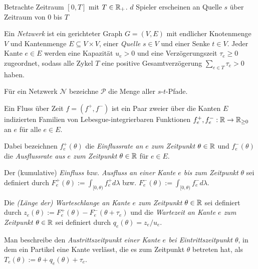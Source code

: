 Betrachte Zeitraum $[0,T]$ mit $T\in\mathbb{R}_+$.
$d$ Spieler erscheinen an Quelle $s$ über Zeitraum von $0$ bis $T$

\begin{definition}[Netzwerk]
	Ein \emph{Netzwerk} ist ein gerichteter Graph $G=(V,E)$ mit endlicher Knotenmenge $V$ und Kantenmenge $E\subseteq V\times V$, einer \emph{Quelle} $s\in V$ und einer Senke $t\in V$.
	Jeder Kante $e\in E$ werden eine Kapazität $u_e > 0$ und eine Verzögerungszeit $\tau_e\geq 0$ zugeordnet, sodass alle Zykel $T$ eine positive Gesamtverzögerung $\sum_{e\in T}\tau_e > 0$ haben.
\end{definition}

Für ein Netzwerk $\mathcal{N}$ bezeichne $\mathcal{P}$ die Menge aller $s$-$t$-Pfade.

\begin{definition}
	Ein Fluss über Zeit $f=(f^+, f^-)$ ist ein Paar zweier über die Kanten $E$ indizierten Familien von Lebesgue-integrierbaren Funktionen $f^+_e,f^-_e: \mathbb{R} \to \mathbb{R}_{\geq 0}$ an $e$ für alle $e\in E$.
	
	Dabei bezeichnen $f_e^+(\theta)$ die \emph{Einflussrate an $e$ zum Zeitpunkt $\theta\in\mathbb{R}$} und $f_e^-(\theta)$ die \emph{Ausflussrate aus $e$ zum Zeitpunkt $\theta\in\mathbb{R}$} für $e\in E$.
	
	Der (kumulative) \emph{Einfluss bzw. Ausfluss an einer Kante $e$ bis zum Zeitpunkt $\theta$} sei definiert durch $F^+_e(\theta):=\int_{[0,\theta)} f^+_e d\lambda$ bzw. $F^-_e(\theta):=\int_{[0,\theta)} f^-_e d\lambda$.
	
	Die \emph{(Länge der) Warteschlange an Kante $e$ zum Zeitpunkt $\theta\in\mathbb{R}$} sei definiert durch $z_e(\theta):= F_e^+(\theta) - F_e^-(\theta + \tau_e)$ und die \emph{Wartezeit an Kante $e$ zum Zeitpunkt $\theta\in\mathbb{R}$} sei definiert durch $q_e(\theta) = z_e / u_e$.
	
	Man beschreibe den \emph{Austrittszeitpunkt einer Kante $e$ bei Eintrittszeitpunkt $\theta$}, in dem ein Partikel eine Kante verlässt, die es zum Zeitpunkt $\theta$ betreten hat, als $T_e(\theta):=\theta + q_e(\theta) + \tau_e$.
\end{definition}

